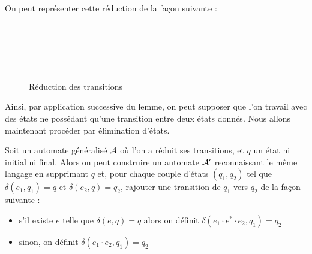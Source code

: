 On peut représenter cette réduction de la façon suivante :

\begin{figure}[htb]
    \centering
    \rule{17cm}{0.5pt}\\
    \vspace{0.5cm}
    \rule{17cm}{0.5pt}\\
    \vspace{0.5cm}
    \caption{Réduction des transitions}
\end{figure}

Ainsi, par application successive du lemme, on peut supposer que l'on travail avec des états ne possédant qu'une transition entre deux états donnés. Nous allons maintenant procéder par élimination d'états.

\begin{lem}
    Soit un automate généralisé $\mathcal A$ où l'on a réduit ses transitions, et $q$ un état ni initial ni final. Alors on peut construire un automate $\mathcal A'$ reconnaissant le même langage en supprimant $q$ et, pour chaque couple d'états $(q_1,q_2)$ tel que $\delta(e_1,q_1)=q$ et $\delta(e_2,q)=q_2$, rajouter une transition de $q_1$ vers $q_2$ de la façon suivante :
    \begin{itemize}[label=$\bullet$]
        \item s'il existe $e$ telle que $\delta(e,q)=q$ alors on définit $\delta(e_1\cdot e^* \cdot e_2,q_1)=q_2$
        \item sinon, on définit $\delta(e_1\cdot e_2,q_1)=q_2$
    \end{itemize}
\end{lem}

